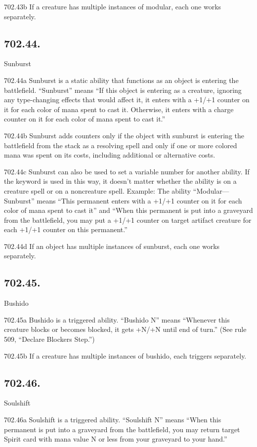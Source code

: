 702.43b If a creature has multiple instances of modular, each one works separately.

\subsection*{702.44.}
Sunburst

702.44a Sunburst is a static ability that functions as an object is entering the battlefield. “Sunburst” means “If this object is entering as a creature, ignoring any type-changing effects that would affect it, it enters with a +1/+1 counter on it for each color of mana spent to cast it. Otherwise, it enters with a charge counter on it for each color of mana spent to cast it.”

702.44b Sunburst adds counters only if the object with sunburst is entering the battlefield from the stack as a resolving spell and only if one or more colored mana was spent on its costs, including additional or alternative costs.

702.44c Sunburst can also be used to set a variable number for another ability. If the keyword is used in this way, it doesn’t matter whether the ability is on a creature spell or on a noncreature spell.
Example: The ability “Modular—Sunburst” means “This permanent enters with a +1/+1 counter on it for each color of mana spent to cast it” and “When this permanent is put into a graveyard from the battlefield, you may put a +1/+1 counter on target artifact creature for each +1/+1 counter on this permanent.”

702.44d If an object has multiple instances of sunburst, each one works separately.

\subsection*{702.45.}
Bushido

702.45a Bushido is a triggered ability. “Bushido N” means “Whenever this creature blocks or becomes blocked, it gets +N/+N until end of turn.” (See rule 509, “Declare Blockers Step.”)

702.45b If a creature has multiple instances of bushido, each triggers separately.

\subsection*{702.46.}
Soulshift

702.46a Soulshift is a triggered ability. “Soulshift N” means “When this permanent is put into a graveyard from the battlefield, you may return target Spirit card with mana value N or less from your graveyard to your hand.”

